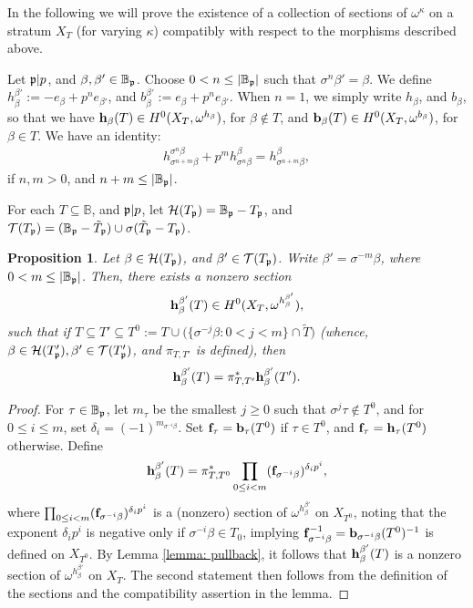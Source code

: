\documentclass[11pt,pdflatex]{amsart}
\theoremstyle{plain}
\theoremstyle{definition}
\theoremstyle{plain}
\newtheorem{prop}[theorem]{Proposition}
\theoremstyle{definition}
\theoremstyle{remark}
\numberwithin{equation}{section}
\numberwithin{figure}{section} \numberwithin{table}{subsection}
\newcommand{\gerp}{{\frak{p}}}
\newcommand{\calH}{{\mathcal{H}}}
\newcommand{\calT}{{\mathcal{T}}}
\def\BB{\mathbb{B}}
\begin{document}
In the following we will prove the existence of a collection of sections of $\omega^\kappa$ on a stratum $X_T$ (for varying $\kappa$) compatibly with respect to the morphisms described above.

 Let $\gerp|p$, and $\beta,\beta' \in \BB_\gerp$. Choose $0<n\leq |\BB_\gerp|$ such that $\sigma^n\beta'=\beta$. We define $h_\beta^{\beta'}:=-e_{\beta}+ p^n e_{\beta'}$, and $b_\beta^{\beta'}:=e_{\beta}+p^n e_{\beta'}$. When $n=1$, we simply write $h_\beta$, and $b_\beta$, so that we have ${\bf h}_\beta(T) \in H^0(X_T,\omega^{h_\beta})$, for $\beta \not\in T$, and ${\bf b}_\beta(T) \in H^0(X_T,\omega^{b_\beta})$, for $\beta \in T$. We have an identity:
\begin{eqnarray}\label{equation: Hasse} h_{\sigma^{n+m}{\beta}}^{\sigma^n\beta} + p^m h_{\sigma^n\beta}^\beta =h_{\sigma^{n+m}\beta}^{\beta},\end{eqnarray} if $n,m>0$, and $n+m \leq |\BB_\gerp|$.  

For each $T \subseteq \BB$, and  $\gerp|p$, let $\calH(T_\gerp)=\BB_\gerp-T_\gerp$, and $\calT(T_\gerp)=(\BB_\gerp-\tilde{T}_\gerp) \cup \sigma(\tilde{T}_\gerp-T_\gerp)$.

\begin{prop} \label{prop: sections} Let $\beta \in \calH(T_\gerp)$, and $\beta' \in \calT(T_\gerp)$. Write $\beta'=\sigma^{-m}\beta$, where $0<m\leq |\BB_\gerp|$. Then, there exists a nonzero section $${\bf h}_\beta^{\beta'}(T) \in H^0(X_T,\omega^{h_\beta^{\beta'}}),$$ such that 
if $T \subseteq T' \subseteq  T^0:=T \cup \big( \{\sigma^{-j}\beta: 0<j<m\} \cap \tilde{T}\big)$ (whence, $\beta \in \calH(T'_\gerp), \beta'\in \calT(T'_\gerp)$, and $\pi_{T,T'}$ is defined),  then $${\bf h}_{\beta}^{\beta'}(T)=\pi_{T,T'}^*{\bf h}_{\beta}^{\beta'}(T').$$
\end{prop}

\begin{proof} For $\tau \in \BB_\gerp$, let $m_\tau$ be the smallest $j \geq 0$ such that $\sigma^{j}\tau \not \in T^0$, and for $0 \leq i \leq m$,  set $\delta_i=(-1)^{m_{\sigma^{-i}\beta}}$.  Set ${\bf f}_\tau={\bf b}_\tau(T^0)$ if $\tau \in T^0$, and ${\bf f}_\tau={\bf h}_\tau(T^0)$ otherwise. Define $${\bf h}_\beta^{\beta'}(T)=\pi_{T,T^0}^*\displaystyle\prod_{0 \leq i < m} ({\bf f}_{\sigma^{-i}\beta})^{\delta_i p^i},$$
 where $ \prod_{0 \leq i < m} ({\bf f}_{\sigma^{-i}\beta})^{\delta_i p^i}$ is a (nonzero) section of  $\omega^{h_\beta^{\beta'}}$ on $X_{T^0}$, noting that the exponent $\delta_ip^i$ is negative only if $\sigma^{-i}\beta \in T_0$, implying ${\bf f}_{\sigma^{-i}\beta}^{-1}={\bf b}_{\sigma^{-i}\beta}(T^0)^{-1}$  is defined on $X_{T^0}$. By Lemma \ref{lemma: pullback}, it follows that  ${\bf h}_\beta^{\beta'}(T)$ is a nonzero section of $\omega^{h_\beta^{\beta'}}$ on $X_T$. The second statement then follows from the definition of the sections and the compatibility assertion in the lemma.
\end{proof}
\end{document}
